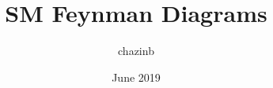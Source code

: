 \documentclass{article}
\title{SM Feynman Diagrams}
\author{chazinb}
\date{June 2019}
\begin{document}
\newcommand{\keyword}[1]{\textbf{#1}}
\newcommand{\tabhead}[1]{\textbf{#1}}
\newcommand{\code}[1]{\texttt{#1}}
\newcommand{\file}[1]{\texttt{\bfseries#1}}
\newcommand{\option}[1]{\texttt{\itshape#1}}
\setlength{\parskip}{3mm}


\maketitle

%
\clearpage

\clearpage
%
\clearpage
%
\clearpage
%
\clearpage
%
\clearpage
%
\clearpage
%
\end{document}

